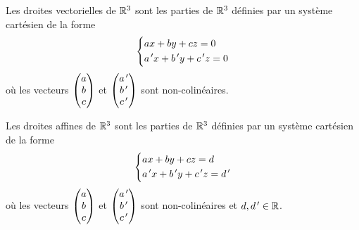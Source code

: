 \begin{ex}
Les droites vectorielles de \(\mathbb{R}^3\) sont les parties de \(\mathbb{R}^3\) définies par un système cartésien de la forme \[\begin{dcases}
ax+by+cz=0 \\
a^{\,\prime} x+b^{\,\prime} y+c^{\,\prime} z=0
\end{dcases}\] où les vecteurs \(\begin{pmatrix}a\\b\\c\end{pmatrix}\) et \(\begin{pmatrix}a^{\,\prime}\\b^{\,\prime}\\c^{\,\prime}\end{pmatrix}\) sont non-colinéaires.
\end{ex}

\begin{ex}
Les droites affines de \(\mathbb{R}^3\) sont les parties de \(\mathbb{R}^3\) définies par un système cartésien de la forme \[\begin{dcases}
ax+by+cz=d \\
a^{\,\prime} x+b^{\,\prime} y+c^{\,\prime} z=d^{\,\prime}
\end{dcases}\] où les vecteurs \(\begin{pmatrix}a\\b\\c\end{pmatrix}\) et \(\begin{pmatrix}a^{\,\prime}\\b^{\,\prime}\\c^{\,\prime}\end{pmatrix}\) sont non-colinéaires et \(d,d^{\,\prime}\in\mathbb{R}\).
\end{ex}